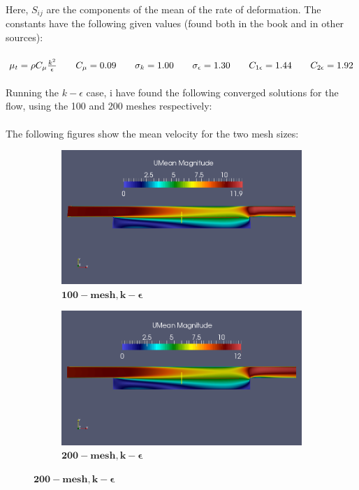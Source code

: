 \documentclass[a4paper,english,11pt,twoside]{article}
\newcommand{\tab}{\hspace*{2em}}
\begin{document}
\\
Here, $S_{ij}$ are the components of the mean of the rate of deformation. The constants have the following given values (found both in the book and in other sources):\\
\\
$\mu_t = \rho C_{\mu}\frac{k^2}{\epsilon}\tab C_{\mu} = 0.09\tab\sigma_k = 1.00\tab\sigma_{\epsilon} = 1.30\tab C_{1\epsilon} = 1.44\tab C_{2\epsilon} = 1.92$
\\
\\
Running the $k-\epsilon$ case, i have found the following converged solutions for the flow, using the 100 and 200 meshes respectively:\\
\\
The following figures show the mean velocity for the two mesh sizes:\\
\begin{figure}[h!]
	\begin{subfigure}{0.5\textwidth}
		\includegraphics[width=0.95\linewidth]{simple_ke_10_mean_u.png}
		\caption{$\mathbf{ 100-mesh, k-\epsilon}$}
	\end{subfigure}
	\begin{subfigure}{0.5\textwidth}
		\includegraphics[width=0.95\linewidth]{simple_ke_20_mean_u.png}
		\caption{$\mathbf{ 200-mesh, k-\epsilon}$}
	\end{subfigure}
\end{figure}
\end{document}

